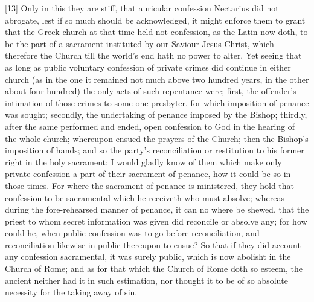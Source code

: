 [13] Only in this they are stiff, that auricular confession Nectarius did not abrogate, lest if so much should be acknowledged, it might enforce them to grant that the Greek church at that time held not confession, as the Latin now doth, to be the part of a sacrament instituted by our Saviour Jesus Christ, which therefore the Church till the world’s end hath no power to alter. Yet seeing that as long as public voluntary confession of private crimes did continue in either church (as in the one it remained not much above two hundred years, in the other about four hundred) the only acts of such repentance were; first, the offender’s intimation of those crimes to some one presbyter, for which imposition of penance was sought; secondly, the undertaking of penance imposed by the Bishop; thirdly, after the same performed and ended, open confession to God in the hearing of the whole church; whereupon ensued the prayers of the Church; then the Bishop’s imposition of hands; and so the party’s reconciliation or restitution to his former right in the holy sacrament: I would gladly know of them which make only private confession a part of their sacrament of penance, how it could be so in those times. For where the sacrament of penance is ministered, they hold that confession to be sacramental which he receiveth who must absolve; whereas during the fore-rehearsed manner of penance, it can no where be shewed, that the priest to whom secret information was given did reconcile or absolve any; for how could he, when public confession was to go before reconciliation, and reconciliation likewise in public thereupon to  ensue? So that if they did account any confession sacramental, it was surely public, which is now abolisht in the Church of Rome; and as for that which the Church of Rome doth so esteem, the ancient neither had it in such estimation, nor thought it to be of so absolute necessity for the taking away of sin.

